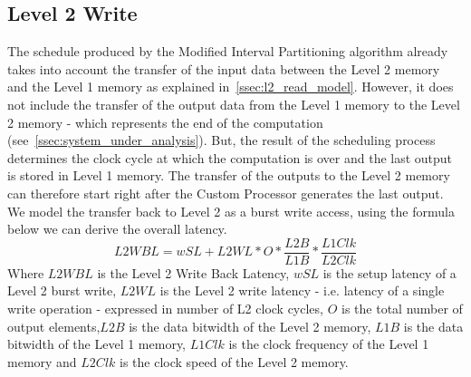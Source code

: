 \subsection{Level 2 Write}
The schedule produced by the Modified Interval Partitioning algorithm already takes into account the transfer of the input data between the Level 2 memory and the Level 1 memory as explained in~\ref{ssec:l2_read_model}. However, it does not include the transfer of the output data from the Level 1 memory to the Level 2 memory - which represents the end of the computation (see~\ref{ssec:system_under_analysis}). But, the result of the scheduling process determines the clock cycle at which the computation is over and the last output is stored in Level 1 memory. The transfer of the outputs to the Level 2 memory can therefore start right after the Custom Processor generates the last output. We model the transfer back to Level 2 as a burst write access, using the formula below we can derive the overall latency.
$$
L2WBL = wSL + L2WL * O * \frac{L2B}{L1B} * \frac{L1Clk}{L2Clk}
$$
Where $L2WBL$ is the Level 2 Write Back Latency, $wSL$ is the setup latency of a Level 2 burst write, $L2WL$ is the Level 2 write latency - i.e. latency of a single write operation - expressed in number of L2 clock cycles, $O$ is the total number of output elements,$L2B$ is the data bitwidth of the Level 2 memory, $L1B$ is the data bitwidth of the Level 1 memory, $L1Clk$ is the clock frequency of the Level 1 memory and $L2Clk$ is the clock speed of the Level 2 memory.

